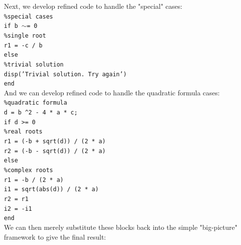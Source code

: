 \documentclass[../main.tex]{subfiles}
\begin{document}
\begin{example}
    \noindent Next, we develop refined code to handle the "special" cases:\\

    \texttt{\%special cases\\
    \indent if b $\sim$= 0\\
    \indent\hspace{2mm} \%single root\\
    \indent\hspace{2mm} r1 = -c / b\\
    \indent else\\
    \indent\hspace{2mm} \%trivial solution\\
    \indent\hspace{2mm} disp('Trivial solution. Try again')\\
    \indent end}\\
    
    \noindent And we can develop refined code to handle the quadratic formula cases:\\

    \texttt{\%quadratic formula\\
    \indent d = b \textasciicircum2 - 4 * a * c;\\
    \indent if d >= 0\\
    \indent\hspace{2mm} \%real roots\\
    \indent\hspace{2mm} r1 = (-b + sqrt(d)) / (2 * a)\\
    \indent\hspace{2mm} r2 = (-b - sqrt(d)) / (2 * a)\\
    \indent else\\
    \indent\hspace{2mm} \%complex roots\\
    \indent\hspace{2mm} r1 = -b / (2 * a)\\
    \indent\hspace{2mm} i1 = sqrt(abs(d)) / (2 * a)\\
    \indent\hspace{2mm} r2 = r1\\
    \indent\hspace{2mm} i2 = -i1\\
    \indent end}\\

    We can then merely substitute these blocks back into the simple "big-picture" framework
to give the final result:


\end{example}
\end{document}
